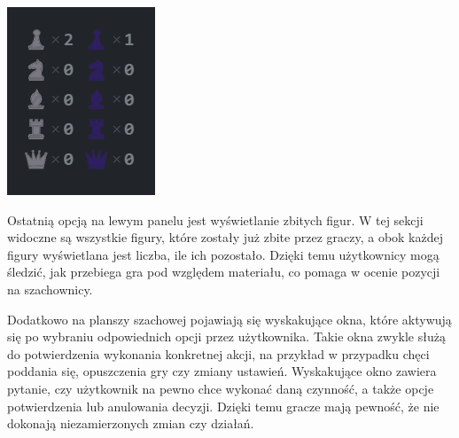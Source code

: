 \documentclass[12pt,a4paper]{article}
\begin{document}
\begin{minipage}[t]{0.2\textwidth} 
    \vspace{0pt} 
    \centering 
    \includegraphics[width=\linewidth]{images/ins_min_capt.png} 
\end{minipage} 
\hfill 
\begin{minipage}[t]{0.7\textwidth} 
    \vspace{0pt} 
    \raggedright 
    Ostatnią opcją na lewym panelu jest wyświetlanie zbitych figur. W tej sekcji widoczne są wszystkie figury, które zostały już zbite przez graczy, a obok każdej figury wyświetlana jest liczba, ile ich pozostało. Dzięki temu użytkownicy mogą śledzić, jak przebiega gra pod względem materiału, co pomaga w ocenie pozycji na szachownicy.
\end{minipage}

\newpage

\noindent
Dodatkowo na planszy szachowej pojawiają się wyskakujące okna, które aktywują się po wybraniu odpowiednich opcji przez użytkownika. Takie okna zwykle służą do potwierdzenia wykonania konkretnej akcji, na przykład w przypadku chęci poddania się, opuszczenia gry czy zmiany ustawień. Wyskakujące okno zawiera pytanie, czy użytkownik na pewno chce wykonać daną czynność, a także opcje potwierdzenia lub anulowania decyzji. Dzięki temu gracze mają pewność, że nie dokonają niezamierzonych zmian czy działań.
\end{document}
